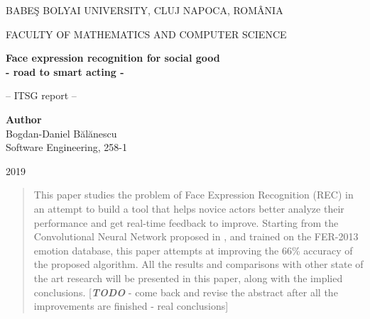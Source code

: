 \documentclass[runningheads,a4paper,11pt]{report}
\begin{document}
\begin{titlepage}
\sloppy
\begin{center}
BABE\c S BOLYAI UNIVERSITY, CLUJ NAPOCA, ROM\^ ANIA

FACULTY OF MATHEMATICS AND COMPUTER SCIENCE

\vspace{5cm}

\Huge \textbf
{
Face expression recognition for social good \\
- road to smart acting -
}

\vspace{1cm}

\normalsize -- ITSG report --

\end{center}


\vspace{5cm}

\begin{flushright}
\Large{\textbf{Author}}\\
Bogdan-Daniel B\u{a}l\u{a}nescu\\
Software Engineering, 258-1
\end{flushright}

\vspace{4cm}

\begin{center}
2019
\end{center}

\end{titlepage}


\begin{abstract}
	This paper studies the problem of Face Expression Recognition (REC) in an attempt to build a tool that helps novice actors better analyze their performance and get real-time feedback to improve. Starting from the Convolutional Neural Network proposed in \cite{Arriaga17}, and trained on the FER-2013 emotion database, this paper attempts at improving the 66\% accuracy of the proposed algorithm. All the results and comparisons with other state of the art research will be presented in this paper, along with the implied conclusions. [\textbf{\emph{TODO}} - come back and revise the abstract after all the improvements are finished - real conclusions]
\end{abstract}


\tableofcontents

\newpage

\end{document}
